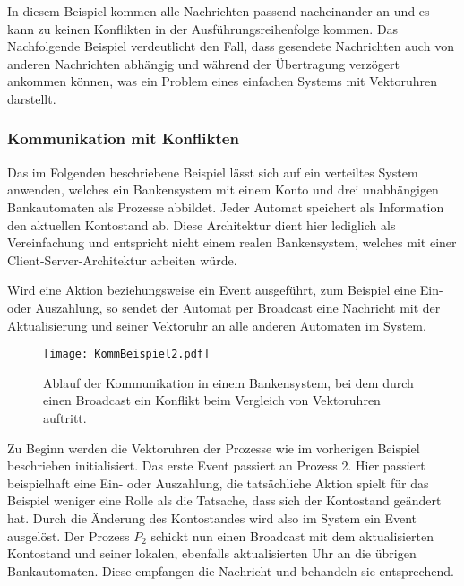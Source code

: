 In diesem Beispiel kommen alle Nachrichten passend nacheinander an und es kann zu keinen Konflikten in der Ausführungsreihenfolge kommen. Das Nachfolgende Beispiel verdeutlicht den Fall, dass gesendete Nachrichten auch von anderen Nachrichten abhängig und während der Übertragung verzögert ankommen können, was ein Problem eines einfachen Systems mit Vektoruhren darstellt.

\subsubsection{Kommunikation mit Konflikten}

Das im Folgenden beschriebene Beispiel lässt sich auf ein verteiltes System anwenden, welches ein Bankensystem mit einem Konto und drei unabhängigen Bankautomaten als Prozesse abbildet. Jeder Automat speichert als Information den aktuellen Kontostand ab. Diese Architektur dient hier lediglich als Vereinfachung und entspricht nicht einem realen Bankensystem, welches mit einer Client-Server-Architektur arbeiten würde. 

Wird eine Aktion beziehungsweise ein Event ausgeführt, zum Beispiel eine Ein- oder Auszahlung, so sendet der Automat per Broadcast eine Nachricht mit der Aktualisierung und seiner Vektoruhr an alle anderen Automaten im System.

\begin{figure}[ht]
	\centering
	\texttt{[image: KommBeispiel2.pdf]}
	\caption[Beispiel einer konfliktbehafteten Kommunikation]{Ablauf der Kommunikation in einem Bankensystem, bei dem durch einen Broadcast ein Konflikt beim Vergleich von Vektoruhren auftritt.}
	\label{figure:kommBeispiel2}
\end{figure}
\FloatBarrier

Zu Beginn werden die Vektoruhren der Prozesse wie im vorherigen Beispiel beschrieben initialisiert. Das erste Event passiert an Prozess 2. Hier passiert beispielhaft eine Ein- oder Auszahlung, die tatsächliche Aktion spielt für das Beispiel weniger eine Rolle als die Tatsache, dass sich der Kontostand geändert hat. Durch die Änderung des Kontostandes wird also im System ein Event ausgelöst. Der Prozess $P_2$ schickt nun einen Broadcast mit dem aktualisierten Kontostand und seiner lokalen, ebenfalls aktualisierten Uhr an die übrigen Bankautomaten. Diese empfangen die Nachricht und behandeln sie entsprechend.

